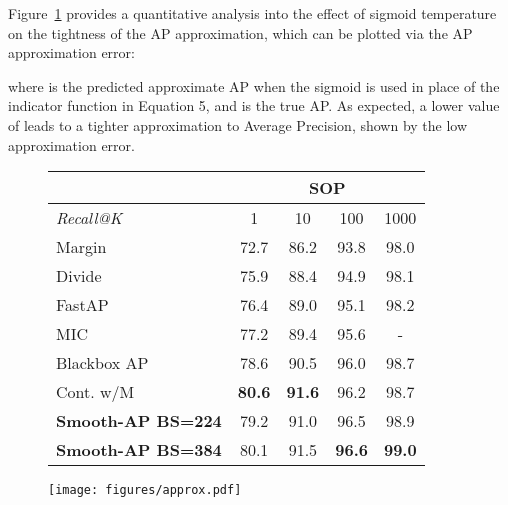 \documentclass[runningheads]{llncs}
\begin{document}
Figure~\ref{approx_fig} provides a quantitative analysis into the effect of sigmoid temperature  on the tightness of the AP approximation, 
which can be plotted via the AP approximation error:

where  is the predicted approximate AP when the sigmoid is used in place of the indicator function in Equation 5, 
and  is the true AP. 
As expected, a lower value of  leads to a tighter approximation to Average Precision, 
shown by the low approximation error.

\setlength{\tabcolsep}{0.5pt}
\begin{figure}[!t]
\begin{minipage}{\textwidth}
  \begin{minipage}[b]{0.55\textwidth}
    \centering
    \footnotesize
    \begin{tabular}{l|cccc}
                          & \multicolumn{4}{c}{\textbf{SOP}}                  \\ \hline
\textit{Recall@K}         & 1             & 10            & 100           & 1000          \\ \hline
Margin  ~\cite{Wu17}                        & 72.7          & 86.2          & 93.8          & 98.0          \\
Divide~\cite{sanakoyeu2019divide}                        & 75.9          & 88.4          & 94.9          & 98.1          \\
FastAP~\cite{Cakir19}                     & 76.4          & 89.0          & 95.1          & 98.2          \\
MIC~\cite{roth2019mic}                       & 77.2          & 89.4          & 95.6          & -             \\
Blackbox AP~\cite{Rolnek20optimizing}               & 78.6          & 90.5          & 96.0          & 98.7          \\
Cont. w/M~\cite{wang2020cross}                 & \textbf{80.6} & \textbf{91.6} & 96.2          & 98.7          \\ \hline
\textbf{Smooth-AP BS=224} & 79.2          & 91.0          & 96.5          & 98.9          \\
\textbf{Smooth-AP BS=384} & 80.1          & 91.5          & \textbf{96.6} & \textbf{99.0}
\end{tabular}
\label{tab:object_ex}
\end{minipage}
\hfill
   \begin{minipage}[b]{0.43\textwidth}
    \centering
	\texttt{[image: figures/approx.pdf]}
    \label{approx_fig}
   \end{minipage}
\end{minipage}
\end{figure}
\end{document}
